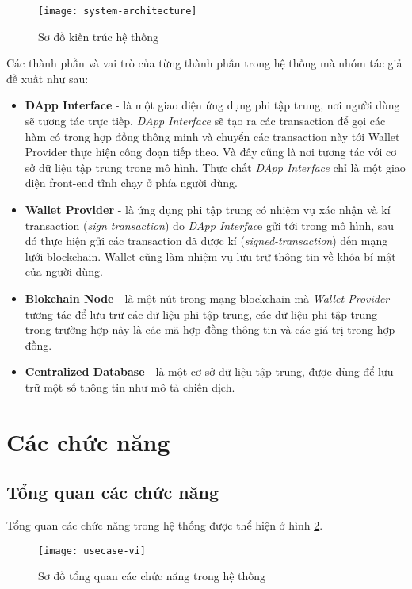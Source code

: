 \documentclass[../main-report.tex]{subfiles}
\begin{document}
\begin{figure}[ht!]
\begin{center}
\label{fig:system-architecture}
\texttt{[image: system-architecture]}
\caption{Sơ đồ kiến trúc hệ thống}
\end{center}
\end{figure}

Các thành phần và vai trò của từng thành phần trong hệ thống mà nhóm tác giả đề xuất như sau:

\begin{itemize}
\item \textbf{DApp Interface} - là một giao diện ứng dụng phi tập trung, nơi người dùng sẽ tương tác trực tiếp. \textit{DApp Interface} sẽ tạo ra các \gls{transaction} để gọi các hàm có trong hợp đồng thông minh và chuyển các \gls{transaction} này tới Wallet Provider thực hiện công đoạn tiếp theo. Và đây cũng là nơi tương tác với cơ sở dữ liệu tập trung trong mô hình. Thực chất \textit{DApp Interface} chỉ là một giao diện front-end tĩnh chạy ở phía người dùng.
\item \textbf{Wallet Provider} - là ứng dụng phi tập trung có nhiệm vụ xác nhận và kí transaction (\textit{sign transaction}) do \textit{DApp Interfac}e gửi tới trong mô hình, sau đó thực hiện gửi các \gls{transaction} đã được kí (\textit{signed-transaction}) đến mạng lưới \gls{blockchain}. Wallet cũng làm nhiệm vụ lưu trữ thông tin về khóa bí mật của người dùng.
\item \textbf{Blokchain Node} - là một nút trong mạng \gls{blockchain} mà \textit{Wallet Provider} tương tác để lưu trữ các dữ liệu phi tập trung, các dữ liệu phi tập trung trong trường hợp này là các mã hợp đồng thông tin và các giá trị trong hợp đồng.
\item \textbf{Centralized Database} - là một cơ sở dữ liệu tập trung, được dùng để lưu trữ một số thông tin như mô tả chiến dịch.
\end{itemize}

\section{Các chức năng}
\subsection{Tổng quan các chức năng}
Tổng quan các chức năng trong hệ thống được thể hiện ở hình \ref{fig:usecase-diagram}.

\begin{figure}[ht!]
\begin{center}
\label{fig:usecase-diagram}
\texttt{[image: usecase-vi]}
\caption{Sơ đồ tổng quan các chức năng trong hệ thống}
\end{center}
\end{figure}
\end{document}
